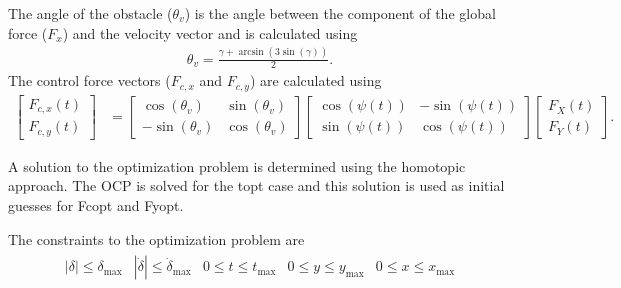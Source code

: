 The angle of the obstacle ($\theta_v$) is the angle between the component of the global force ($F_{x}$) and the velocity vector and is calculated using 
\begin{align}
    \theta_v = \frac{\gamma + \arcsin\left(3\sin\left(\gamma\right)\right)}{2}.
\end{align}
The control force vectors ($F_{c,x}$ and $F_{c,y}$) are calculated using
\begin{align}
    \begin{bmatrix}
        F_{c,x}(t) \\
        F_{c,y}(t)
    \end{bmatrix} &=
    \begin{bmatrix}
        \cos\left(\theta_v\right) & \sin\left(\theta_v\right) \\
        -\sin\left(\theta_v\right) & \cos\left(\theta_v\right)
    \end{bmatrix}
    \begin{bmatrix}
        \cos\left(\psi(t)\right) & -\sin\left(\psi(t)\right) \\
        \sin\left(\psi(t)\right) & \cos\left(\psi(t)\right)
    \end{bmatrix}
    \begin{bmatrix}
        F_{X}(t)\\
        F_{Y}(t)
    \end{bmatrix}.
\end{align}

A solution to the optimization problem is determined using the homotopic approach. The OCP is solved for the topt case and this solution is used as initial guesses for Fcopt and Fyopt. 

The constraints to the optimization problem are 
\begin{align}
    \begin{array}{ccccc}
        |\delta| \leq \delta_\text{max} & |\dot\delta| \leq \dot\delta_\text{max} & 
        0 \leq t \leq t_{\text{max}} & 0 \leq y \leq y_\text{max} & 0 \leq x \leq x_\text{max}
    \end{array}
\end{align}

